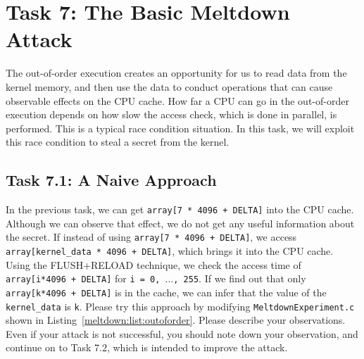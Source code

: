 \section{Task 7: The Basic Meltdown Attack}


The out-of-order execution creates an opportunity for us to read data from 
the kernel memory, and then use the data to conduct operations that can cause
observable effects on the CPU cache. How far a CPU can go in 
the out-of-order execution depends on
how slow the access check, which is done in parallel, is performed. 
This is a typical race condition situation. In this task, we will exploit this race condition
to steal a secret from the kernel. 


\subsection{Task 7.1: A Naive Approach}

In the previous task, we can get \texttt{array[7 * 4096 + DELTA]} into the CPU cache.
Although we can observe that effect, we do not get any useful information about 
the secret. If instead of using \texttt{array[7 * 4096 + DELTA]}, we 
access \texttt{array[kernel\_data * 4096 + DELTA]}, which brings it
into the CPU cache. 
Using the FLUSH+RELOAD technique, we check the access time of
\texttt{array[i*4096 + DELTA]} for \texttt{i = 0, $\ldots$, 255}. 
If we find out that only
\texttt{array[k*4096 + DELTA]} is in the cache, we can infer that 
the value of the \texttt{kernel\_data} is \texttt{k}.  
Please try this approach by modifying \texttt{MeltdownExperiment.c} shown in
Listing~\ref{meltdown:list:outoforder}. Please describe your observations.
Even if your attack is not successful, you should note down your observation, and continue on
to Task 7.2, which is intended to improve the attack. 



